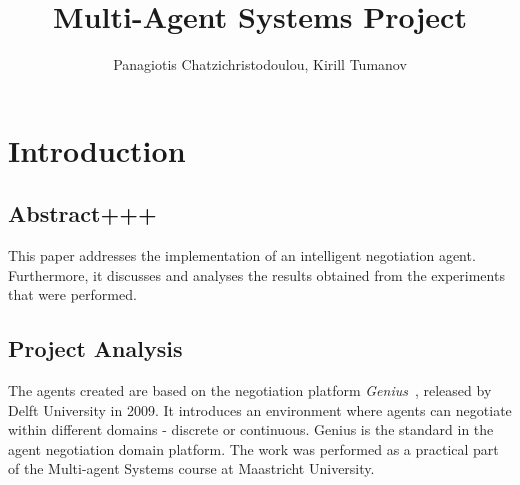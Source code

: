 \documentclass[html]{report}    %
\title{Multi-Agent Systems Project}  %
\author{Panagiotis Chatzichristodoulou, Kirill Tumanov}
\begin{document}

\maketitle                 %
\section{Introduction}
\subsection{Abstract+++}
This paper addresses the implementation of an intelligent negotiation agent. Furthermore, it discusses and analyses the results obtained from the experiments that were performed. 
\subsection{Project Analysis}
The agents created are based on the negotiation platform \textit{Genius}~\cite{genius}, released by Delft University in 2009. It introduces an environment where agents can negotiate within different domains - discrete or continuous. Genius is the standard in the agent negotiation domain platform. The work was performed as a practical part of the Multi-agent Systems course at Maastricht University. 
\end{document}
